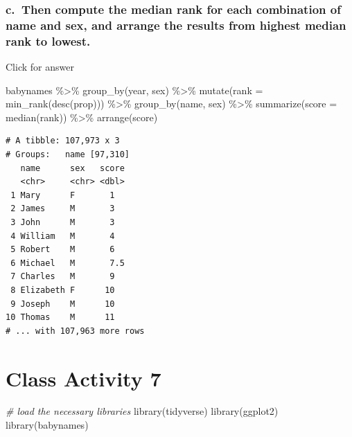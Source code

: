 \documentclass[
]{book}
\newenvironment{Shaded}{\begin{snugshade}}{\end{snugshade}}
\newcommand{\AttributeTok}[1]{\textcolor[rgb]{0.77,0.63,0.00}{#1}}
\newcommand{\CommentTok}[1]{\textcolor[rgb]{0.56,0.35,0.01}{\textit{#1}}}
\newcommand{\FunctionTok}[1]{\textcolor[rgb]{0.00,0.00,0.00}{#1}}
\newcommand{\NormalTok}[1]{#1}
\newcommand{\SpecialCharTok}[1]{\textcolor[rgb]{0.00,0.00,0.00}{#1}}
\begin{document}
\hypertarget{c.-then-compute-the-median-rank-for-each-combination-of-name-and-sex-and-arrange-the-results-from-highest-median-rank-to-lowest.}{%
\subsection{c.~Then compute the median rank for each combination of name and sex, and arrange the results from highest median rank to lowest.}\label{c.-then-compute-the-median-rank-for-each-combination-of-name-and-sex-and-arrange-the-results-from-highest-median-rank-to-lowest.}}

Click for answer

\begin{Shaded}
\begin{Highlighting}[]
\NormalTok{babynames }\SpecialCharTok{\%\textgreater{}\%} 
  \FunctionTok{group\_by}\NormalTok{(year, sex) }\SpecialCharTok{\%\textgreater{}\%} 
  \FunctionTok{mutate}\NormalTok{(}\AttributeTok{rank =} \FunctionTok{min\_rank}\NormalTok{(}\FunctionTok{desc}\NormalTok{(prop))) }\SpecialCharTok{\%\textgreater{}\%}
  \FunctionTok{group\_by}\NormalTok{(name, sex) }\SpecialCharTok{\%\textgreater{}\%}
  \FunctionTok{summarize}\NormalTok{(}\AttributeTok{score =} \FunctionTok{median}\NormalTok{(rank)) }\SpecialCharTok{\%\textgreater{}\%}
  \FunctionTok{arrange}\NormalTok{(score) }
\end{Highlighting}
\end{Shaded}

\begin{verbatim}
# A tibble: 107,973 x 3
# Groups:   name [97,310]
   name      sex   score
   <chr>     <chr> <dbl>
 1 Mary      F       1  
 2 James     M       3  
 3 John      M       3  
 4 William   M       4  
 5 Robert    M       6  
 6 Michael   M       7.5
 7 Charles   M       9  
 8 Elizabeth F      10  
 9 Joseph    M      10  
10 Thomas    M      11  
# ... with 107,963 more rows
\end{verbatim}

\hypertarget{class-activity-7}{%
\chapter{Class Activity 7}\label{class-activity-7}}

\begin{Shaded}
\begin{Highlighting}[]
\CommentTok{\# load the necessary libraries}
\FunctionTok{library}\NormalTok{(tidyverse)}
\FunctionTok{library}\NormalTok{(ggplot2)}
\FunctionTok{library}\NormalTok{(babynames)}
\end{Highlighting}
\end{Shaded}
\end{document}
